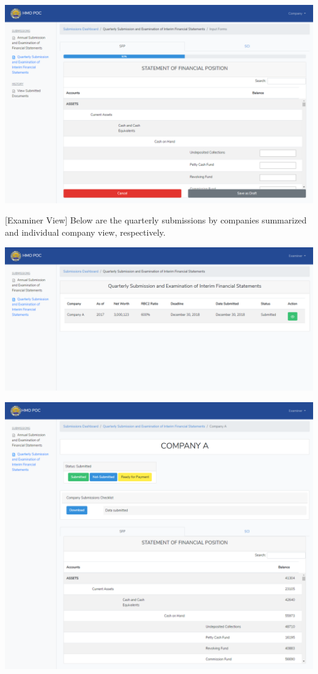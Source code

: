 \documentclass{article}
\begin{document}
\includegraphics[keepaspectratio=true]{up-ic-screens/image211}{}%

[Examiner View] Below are the quarterly submissions
by companies summarized and individual company view,
respectively.%

\includegraphics[keepaspectratio=true]{up-ic-screens/image125}{}%

\includegraphics[keepaspectratio=true]{up-ic-screens/image96}{}%
\end{document}
